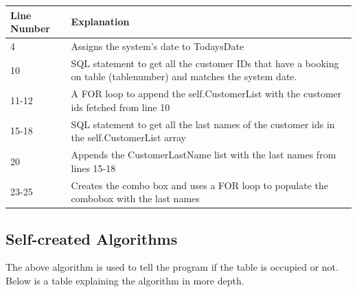 \begin{center}
\begin{tabular}{|p{5cm}|p{7.5cm}|}
\hline
\textbf{Line Number} & \textbf{Explanation} \\ \hline
4 & Assigns the system's date to TodaysDate \\ \hline
10 & SQL statement to get all the customer IDs that have a booking on table (tablenumber) and matches the system date.  \\ \hline
11-12 & A FOR loop to append the self.CustomerList with the customer ids fetched from line 10 \\ \hline
15-18 & SQL statement to get all the last names of the customer ids in the self.CustomerList array \\ \hline
20 & Appends the CustomerLastName list with the last names from lines 15-18 \\ \hline
23-25 & Creates the combo box and uses a FOR loop to populate the combobox with the last names \\ \hline


\end{tabular}
\end{center}

\newpage
\subsection{Self-created Algorithms}
The above algorithm is used to tell the program if the table is occupied or not. Below is a table explaining the algorithm in more depth.

